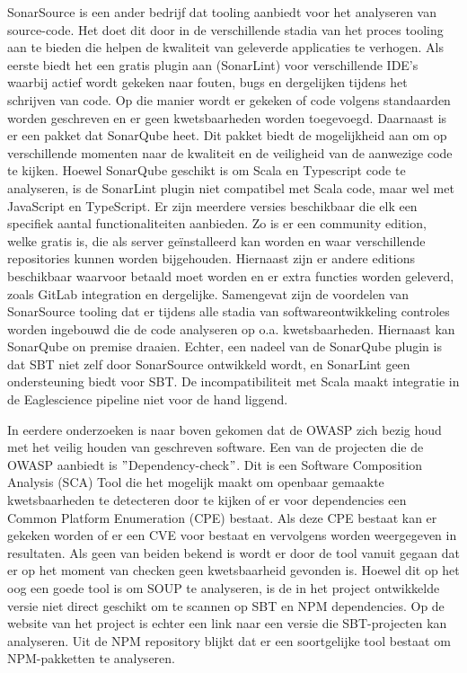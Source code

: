 SonarSource is een ander bedrijf dat tooling aanbiedt voor het analyseren van source-code. Het doet dit door in de verschillende stadia van het proces tooling aan te bieden die helpen de kwaliteit van geleverde applicaties te verhogen. Als eerste biedt het een gratis plugin aan (SonarLint) voor verschillende IDE's waarbij actief wordt gekeken naar fouten, bugs en dergelijken tijdens het schrijven van code. Op die manier wordt er gekeken of code volgens standaarden worden geschreven en er geen kwetsbaarheden worden toegevoegd. Daarnaast is er een pakket dat SonarQube heet. Dit pakket biedt de mogelijkheid aan om op verschillende momenten naar de kwaliteit en de veiligheid van de aanwezige code te kijken. Hoewel SonarQube geschikt is om Scala en Typescript code te analyseren, is de SonarLint plugin niet compatibel met Scala code, maar wel met JavaScript en TypeScript. Er zijn meerdere versies beschikbaar die elk een specifiek aantal functionaliteiten aanbieden. Zo is er een community edition, welke gratis is, die als server geïnstalleerd kan worden en waar verschillende repositories kunnen worden bijgehouden. Hiernaast zijn er andere editions beschikbaar waarvoor betaald moet worden en er extra functies worden geleverd, zoals GitLab integration en dergelijke. Samengevat zijn de voordelen van SonarSource tooling dat er tijdens alle stadia van softwareontwikkeling controles worden ingebouwd die de code analyseren op o.a. kwetsbaarheden. Hiernaast kan SonarQube on premise draaien. Echter, een nadeel van de SonarQube plugin is dat SBT niet zelf door SonarSource ontwikkeld wordt, en SonarLint geen ondersteuning biedt voor SBT. De incompatibiliteit met Scala maakt integratie in de Eaglescience pipeline niet voor de hand liggend.

In eerdere onderzoeken is naar boven gekomen dat de OWASP zich bezig houd met het veilig houden van geschreven software. Een van de projecten die de OWASP aanbiedt is $"$Dependency-check$"$. Dit is een Software Composition Analysis (SCA) Tool\citep{OWASP:2017} die het mogelijk maakt om openbaar gemaakte kwetsbaarheden te detecteren door te kijken of er voor dependencies een Common Platform Enumeration (CPE) bestaat. Als deze CPE bestaat kan er gekeken worden of er een CVE voor bestaat en vervolgens worden weergegeven in resultaten. Als geen van beiden bekend is wordt er door de tool vanuit gegaan dat er op het moment van checken geen kwetsbaarheid gevonden is. Hoewel dit op het oog een goede tool is om SOUP te analyseren, is de in het project ontwikkelde versie niet direct geschikt om te scannen op SBT en NPM dependencies. Op de website van het project is echter een link naar een versie die SBT-projecten\citep{Albuch:z.d.} kan analyseren. Uit de NPM repository\citep{npm:z.d.} blijkt dat er een soortgelijke tool bestaat om NPM-pakketten te analyseren.

